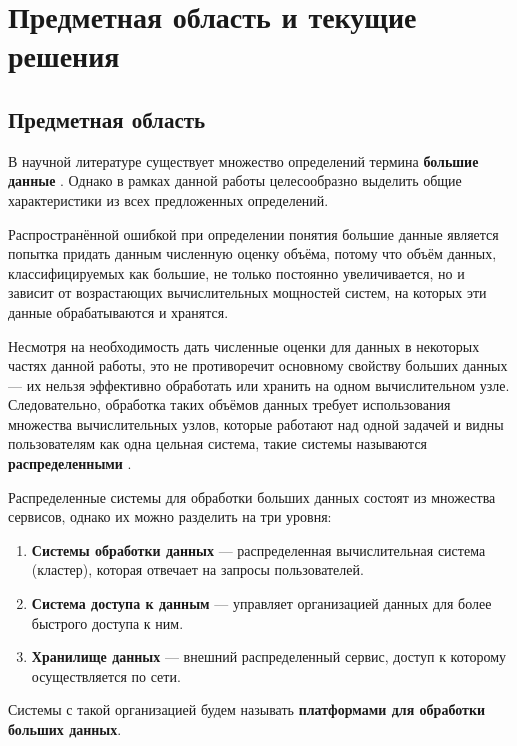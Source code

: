 \section{Предметная область и текущие решения}
\subsection{Предметная область}\label{subsec:definition}

В научной литературе существует множество определений термина \textbf{большие данные} \cite{Bigdata_a_review, Bigdata_an_introduction, Challenges_of_big_data_analysis}. Однако в рамках данной работы целесообразно выделить общие характеристики из всех предложенных определений. 

Распространённой ошибкой при определении понятия большие данные является попытка придать данным численную оценку объёма, потому что объём данных, классифицируемых как большие, не только постоянно увеличивается, но и зависит от возрастающих вычислительных мощностей систем, на которых эти данные обрабатываются и хранятся. 

Несмотря на необходимость дать численные оценки для данных в некоторых частях данной работы, это не противоречит основному свойству больших данных --- их нельзя эффективно обработать или хранить на одном вычислительном узле. Следовательно, обработка таких объёмов данных требует использования множества вычислительных узлов, которые работают над одной задачей и видны пользователям как одна цельная система, такие системы называются \textbf{распределенными} \cite{Time_clocks_and_the_ordering_of_events_in_a_distributed_system}.

Распределенные системы для обработки больших данных состоят из множества сервисов, однако их можно разделить на три уровня: \cite{Spatial_big_data_architecture}
\begin{enumerate}
    \item \textbf{Системы обработки данных} --- распределенная вычислительная система (кластер), которая отвечает на запросы пользователей.
    \item \textbf{Система доступа к данным} --- управляет организацией данных для более быстрого доступа к ним.
    \item \textbf{Хранилище данных} --- внешний распределенный сервис, доступ к которому осуществляется по сети.
\end{enumerate}
Системы с такой организацией будем называть \textbf{платформами для обработки больших данных}.

